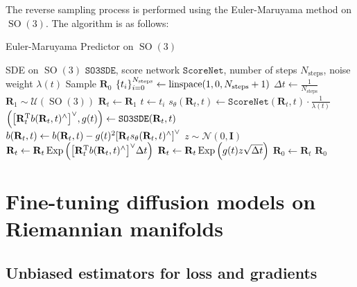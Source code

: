 \documentclass{article}
\theoremstyle{plain}
\theoremstyle{definition}
\theoremstyle{remark}
\DeclareMathOperator{\SO}{SO}
\DeclareMathOperator{\Exp}{\operatorname{Exp}}
\begin{document}
The reverse sampling process is performed using the Euler-Maruyama method on $\SO(3)$. The algorithm is as follows:
\begin{algorithm}[!ht]
    \caption{Euler-Maruyama Predictor on $\SO(3)$}\label{alg:em_predictor_so3}
    \begin{algorithmic}[1]
        \REQUIRE SDE on $\SO(3)$ $\texttt{SO3SDE}$, score network $\texttt{ScoreNet}$, number of steps $N_\text{steps}$, noise weight $\lambda(t)$
        \ENSURE Sample $\mathbf{R}_0$
        \STATE $\qty{t_i}_{i=0}^{N_\text{steps}} \leftarrow \mathrm{linspace}(1, 0, N_\text{steps}+1)$
        \STATE $\Delta t \leftarrow \frac{1}{N_\text{steps}}$
        \STATE $\mathbf{R}_1 \sim \mathcal{U}(\SO(3))$
        \STATE $\mathbf{R}_t \leftarrow \mathbf{R}_1$
        \STATE $t \leftarrow t_i$
        \STATE $s_\theta(\mathbf{R}_t, t) \leftarrow \texttt{ScoreNet}(\mathbf{R}_t, t)\cdot \frac{1}{\lambda(t)}$
        \STATE $\qty(\qty[\mathbf{R}_t^\mathrm{T} b(\mathbf{R}_t, t)^\wedge]^\vee,g(t)) \leftarrow \texttt{SO3SDE}(\mathbf{R}_t, t)$
        \STATE $b(\mathbf{R}_t, t) \leftarrow b(\mathbf{R}_t, t) - g(t)^2 \qty[\mathbf{R}_t s_\theta(\mathbf{R}_t, t)^\wedge]^\vee$
        \STATE $z \sim \mathcal{N}(0, \mathbf{I})$
        \STATE $\mathbf{R}_t \leftarrow \mathbf{R}_t \Exp\qty(\qty[\mathbf{R}_t^\mathrm{T} b(\mathbf{R}_t, t)^\wedge]^\vee\Delta t)$
        \STATE $\mathbf{R}_t \leftarrow \mathbf{R}_t \Exp\qty(g(t)z\sqrt{\Delta t})$
        \ENDFOR
        \STATE $\mathbf{R}_0 \leftarrow \mathbf{R}_t$
        \RETURN $\mathbf{R}_0$
    \end{algorithmic}
\end{algorithm}

\section{Fine-tuning diffusion models on Riemannian manifolds}

\subsection{Unbiased estimators for loss and gradients}
\end{document}
